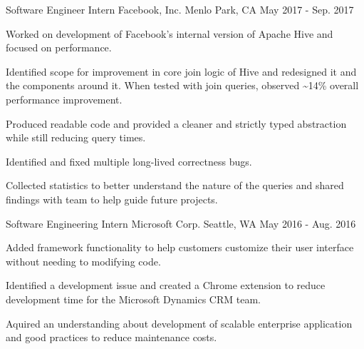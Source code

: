 \begin{cventries}
  \cventry
    {Software Engineer Intern} %
    {Facebook, Inc.} %
    {Menlo Park, CA} %
    {May 2017 - Sep. 2017} %
    {
      \begin{cvitems} %
      	\item Worked on development of Facebook’s internal version of Apache Hive and focused on performance.
      	\item Identified scope for improvement in core join logic of Hive and redesigned it and the components around it. When tested with join queries, observed \textasciitilde 14\% overall performance improvement.
      	\item Produced readable code and provided a cleaner and strictly typed abstraction while still reducing query times.
      	\item Identified and fixed multiple long-lived correctness bugs.
      	\item Collected statistics to better understand the nature of the queries and shared findings with team to help guide future projects.
      \end{cvitems}
    }

  \cventry
    {Software Engineering Intern} %
    {Microsoft Corp.} %
    {Seattle, WA} %
    {May 2016 - Aug. 2016} %
    {
      \begin{cvitems} %
        \item Added framework functionality to help customers customize their user interface without needing to modifying code.
        \item Identified a development issue and created a Chrome extension to reduce development time for the Microsoft Dynamics CRM team.
        \item Aquired an understanding about development of scalable enterprise application and good practices to reduce maintenance costs.
      \end{cvitems}
    }


\end{cventries}
